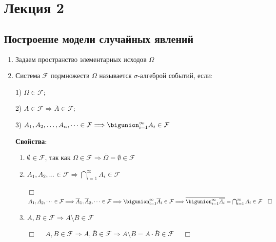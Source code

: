 \documentclass[12pt]{article}
\begin{document}

    \section{Лекция 2}
    
    \subsection{Построение модели случайных явлений}

    \begin{enumerate}
        \item Задаем пространство элементарных исходов $\Omega$

        \item \Defs Система $\mathcal{F}$ подмножеств $\Omega$ называется $\sigma$-алгеброй событий, если:

        1) $\Omega \in \mathcal{F}$;

        2) $A \in \mathcal{F} \Longrightarrow \overline{A} \in \mathcal{F}$;

        3) $A_1, A_2, \dots, A_n, \dots \in \mathcal{F} \Longrightarrow \bigunion_{i = 1}^\infty A_i \in \mathcal{F}$

        \textbf{Свойства}:

        \begin{enumerate}
            \item $\emptyset \in \mathcal{F}$, так как $\Omega \in \mathcal{F} \Longrightarrow \overline{\Omega} = \emptyset \in \mathcal{F}$

            \item $A_1, A_2, \dots \in \mathcal{F} \Longrightarrow \bigcap_{i = 1}^\infty A_i \in \mathcal{F}$

            \begin{tcolorbox}
                $\Box \quad$ $A_1, A_2, \dots \in \mathcal{F} \Longrightarrow
                \overline{A}_1, \overline{A}_2, \dots \in \mathcal{F} \Longrightarrow
                \bigunion_{i = 1}^\infty \overline{A}_i \in \mathcal{F} \Longrightarrow
                \overline{\bigunion_{i = 1}^\infty \overline{A_i}} = \bigcap_{i = 1}^\infty A_i \in \mathcal{F} \quad \Box$
            \end{tcolorbox}

            \item $A, B \in \mathcal{F} \Longrightarrow A \setminus B \in \mathcal{F}$

            \begin{tcolorbox}
                $\Box \quad$ $A, B \in \mathcal{F} \Longrightarrow A, \overline{B} \in \mathcal{F} \Longrightarrow A \setminus B = A \cdot \overline{B} \in \mathcal{F}$ $\quad \Box$
            \end{tcolorbox}


\end{enumerate}
\end{enumerate}
\end{document}
